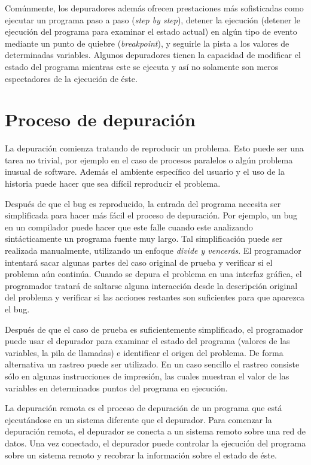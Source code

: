 \documentclass[12pt,legalpaper]{report}
\begin{document}
Comúnmente, los depuradores además ofrecen prestaciones más sofisticadas como ejecutar un programa paso a paso (\textit{step by step}), detener la ejecución (detener le ejecución del programa para examinar el estado actual) en algún tipo de evento mediante un punto de quiebre (\textit{breakpoint}), y seguirle la pista a los valores de determinadas variables.  Algunos depuradores tienen la capacidad de modificar el estado del programa mientras este se ejecuta y así no solamente son meros espectadores de la ejecución de éste.

	\section{Proceso de depuración}

La depuración comienza tratando de reproducir un problema.  Esto puede ser una tarea no trivial, por ejemplo en el caso de procesos paralelos o algún problema inusual de software.  Además el ambiente específico del usuario y el uso de la historia puede hacer que sea difícil reproducir el problema.

Después de que el bug es reproducido, la entrada del programa necesita ser simplificada para hacer más fácil el proceso de depuración.  Por ejemplo, un bug en un compilador puede hacer que este falle cuando este analizando sintácticamente un programa fuente muy largo.  Tal simplificación puede ser realizada manualmente, utilizando un enfoque \textit{divide y vencerás}.  El programador intentará sacar algunas partes del caso original de prueba y verificar si el problema aún continúa.  Cuando se depura el problema en una interfaz gráfica, el programador tratará de saltarse alguna interacción desde la descripción original del problema y verificar si las acciones restantes son suficientes para que aparezca el bug.

Después de que el caso de prueba es suficientemente simplificado, el programador puede usar el depurador para examinar el estado del programa (valores de las variables, la pila de llamadas) e identificar el origen del problema.  De forma alternativa un rastreo puede ser utilizado.  En un caso sencillo el rastreo consiste sólo en algunas instrucciones de impresión, las cuales muestran el valor de las variables en determinados puntos del programa en ejecución.

La depuración remota es el proceso de depuración de un programa que está ejecutándose en un sistema diferente que el depurador.  Para comenzar la depuración remota, el depurador se conecta a un sistema remoto sobre una red de datos.  Una vez conectado, el depurador puede controlar la ejecución del programa  sobre un sistema remoto y recobrar la información sobre el estado de éste.
\end{document}
